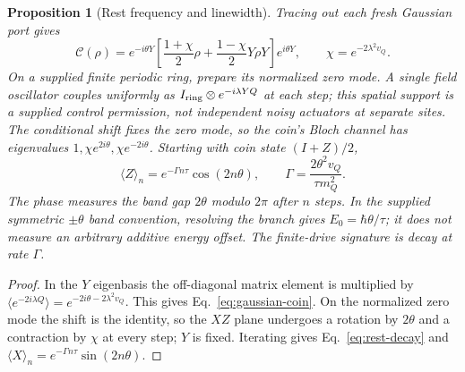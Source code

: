 \documentclass[12pt,a4paper]{article}
\newtheorem{proposition}[theorem]{Proposition}
\theoremstyle{definition}
\theoremstyle{remark}
\begin{document}
\begin{proposition}[Rest frequency and linewidth]\label{prop:field-resonance}
Tracing out each fresh Gaussian port gives
\begin{equation}\label{eq:gaussian-coin}
 \mathcal C(\rho)=e^{-i\theta Y}
 \left[\frac{1+\chi}{2}\rho+\frac{1-\chi}{2}Y\rho Y\right]e^{i\theta Y},
 \qquad \chi=e^{-2\lambda^2v_Q}.
\end{equation}
On a supplied finite periodic ring, prepare its normalized zero mode. A single field oscillator couples uniformly as $I_{\rm ring}\otimes e^{-i\lambda YQ}$ at each step; this spatial support is a supplied control permission, not independent noisy actuators at separate sites. The conditional shift fixes the zero mode, so the coin's Bloch channel has eigenvalues
$1,\chi e^{2i\theta},\chi e^{-2i\theta}$. Starting with coin state
$(I+Z)/2$,
\begin{equation}\label{eq:rest-decay}
 \langle Z\rangle_n=e^{-\Gamma n\tau}\cos(2n\theta),\qquad
 \Gamma=\frac{2\theta^2v_Q}{\tau m_Q^2}.
\end{equation}
The phase measures the band gap $2\theta$ modulo $2\pi$ after $n$ steps. In the supplied symmetric $\pm\theta$ band convention, resolving the branch gives $E_0=\hbar\theta/\tau$; it does not measure an arbitrary additive energy offset. The finite-drive signature is decay at rate $\Gamma$.
\end{proposition}
\begin{proof}
In the $Y$ eigenbasis the off-diagonal matrix element is multiplied by
$\langle e^{-2i\lambda Q}\rangle
=e^{-2i\theta-2\lambda^2v_Q}$. This gives Eq.~\eqref{eq:gaussian-coin}.
On the normalized zero mode the shift is the identity, so the $XZ$ plane undergoes a
rotation by $2\theta$ and a contraction by $\chi$ at every step; $Y$ is
fixed. Iterating gives Eq.~\eqref{eq:rest-decay} and $\langle X\rangle_n=e^{-\Gamma n\tau}\sin(2n\theta)$.
\end{proof}
\end{document}
